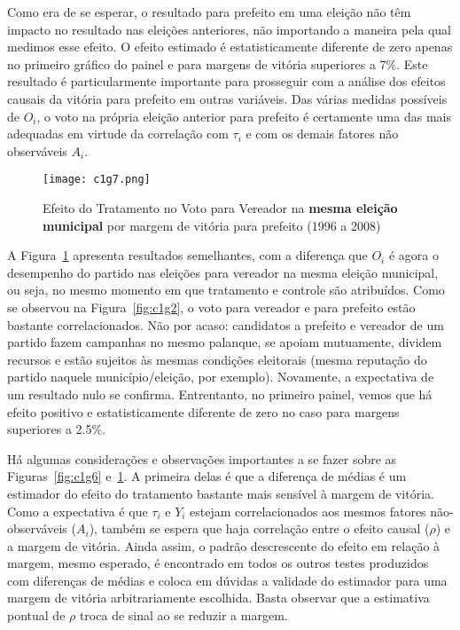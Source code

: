 Como era de se esperar, o resultado para prefeito em uma eleição não têm impacto no resultado nas eleições anteriores, não importando a maneira pela qual medimos esse efeito. O efeito estimado é estatisticamente diferente de zero apenas no primeiro gráfico do painel e para margens de vitória superiores a 7\%. Este resultado é particularmente importante para prosseguir com a análise dos efeitos causais da vitória para prefeito em outras variáveis. Das várias medidas possíveis de $O_{i}$, o voto na própria eleição anterior para prefeito é certamente uma das mais adequadas em virtude da correlação com $\tau_{i}$ e com os demais fatores não observáveis $A_{i}$.

\begin{figure}[htp]
	\centering
	\texttt{[image: c1g7.png]}
	\caption{Efeito do Tratamento no Voto para Vereador na \textbf{mesma eleição municipal} por margem de vitória para prefeito (1996 a 2008)}
	\label{fig:c1g7} 
\end{figure}

A Figura~\ref{fig:c1g7} apresenta resultados semelhantes, com a diferença que $O_{i}$ é agora o desempenho do partido nas eleições para vereador na mesma eleição municipal, ou seja, no mesmo momento em que tratamento e controle são atribuídos. Como se observou na Figura~\ref{fig:c1g2}, o voto para vereador e para prefeito estão bastante correlacionados. Não por acaso: candidatos a prefeito e vereador de um partido fazem campanhas no mesmo palanque, se apoiam mutuamente, dividem recursos e estão sujeitos às mesmas condições eleitorais (mesma reputação do partido naquele município/eleição, por exemplo). Novamente, a expectativa de um resultado nulo se confirma. Entrentanto, no primeiro painel, vemos que há efeito positivo e estatisticamente diferente de zero no caso para margens superiores a 2.5\%.

Há algumas considerações e observações importantes a se fazer sobre as Figuras~\ref{fig:c1g6} e~\ref{fig:c1g7}. A primeira delas é que a diferença de médias é um estimador do efeito do tratamento bastante mais sensível à margem de vitória. Como a expectativa é que $\tau_{i}$ e $Y_{i}$ estejam correlacionados aos mesmos fatores não-observáveis ($A_{i}$), também se espera que haja correlação entre o efeito causal ($\rho$) e a margem de vitória. Ainda assim, o padrão descrescente do efeito em relação à margem, mesmo esperado, é encontrado em todos os outros testes produzidos com diferenças de médias e coloca em dúvidas a validade do estimador para uma margem de vitória arbitrariamente escolhida. Basta observar que a estimativa pontual de $\rho$ troca de sinal ao se reduzir a margem.

